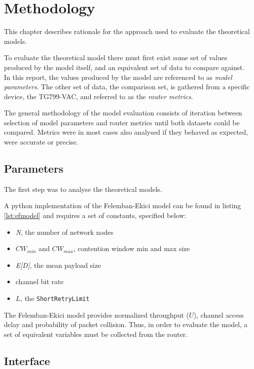 \chapter{Methodology}

This chapter describes rationale for the approach used to evaluate the theoretical models.

To evaluate the theoretical model there must first exist some set of values produced by the model itself, and an equivalent set of data to compare against. In this report, the values produced by the model are referenced to as \emph{model parameters}. The other set of data, the comparison set, is gathered from a specific device, the TG799-VAC, and referred to as the \emph{router metrics}.

The general methodology of the model evaluation consists of iteration between selection of model parameters and router metrics until both datasets could be compared. Metrics were in most cases also analysed if they behaved as expected, were accurate or precise.

\section{Parameters}
The first step was to analyse the theoretical models.

A python implementation of the Felemban-Ekici model can be found in listing \ref{lst:efmodel} and requires a set of constants, specified below:

\begin{itemize}
	\item \emph{N}, the number of network nodes
	\item $CW_{min}$ and $CW_{max}$, contention window min and max size
	\item \emph{E[D]}, the mean payload size
	\item channel bit rate
	\item $L$, the \texttt{ShortRetryLimit}
\end{itemize}

The Felemban-Ekici model provides normalized throughput ($U$), channel access delay and probability of packet collision. Thus, in order to evaluate the model, a set of equivalent variables must be collected from the router.

\section{Interface}


